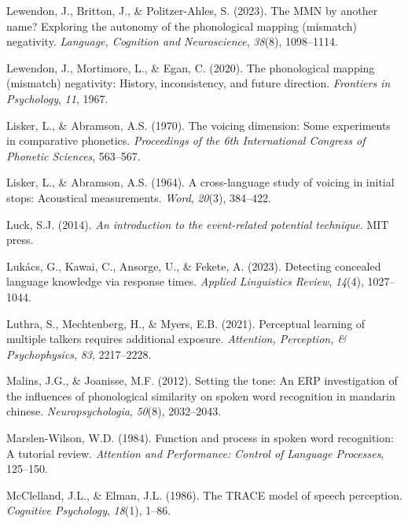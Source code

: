 \documentclass[
  12pt,
  twoside]{article}
\newlength{\cslhangindent}
\newlength{\cslentryspacingunit} %
\newenvironment{CSLReferences}[2] %
 {%
  \setlength{\parindent}{0pt}
  \ifodd #1
  \let\oldpar\par
  \def\par{\hangindent=\cslhangindent\oldpar}
  \fi
  \setlength{\parskip}{#2\cslentryspacingunit}
 }%
 {}
\begin{document}
\begin{CSLReferences}{1}{0}
\leavevmode{}%
Lewendon, J., Britton, J., \& Politzer-Ahles, S. (2023). The MMN by another name? Exploring the autonomy of the phonological mapping (mismatch) negativity. \emph{Language, Cognition and Neuroscience}, \emph{38}(8), 1098--1114.

\leavevmode{}%
Lewendon, J., Mortimore, L., \& Egan, C. (2020). The phonological mapping (mismatch) negativity: History, inconsistency, and future direction. \emph{Frontiers in Psychology}, \emph{11}, 1967.

\leavevmode{}%
Lisker, L., \& Abramson, A.S. (1970). The voicing dimension: Some experiments in comparative phonetics. \emph{Proceedings of the 6th International Congress of Phonetic Sciences}, 563--567.

\leavevmode{}%
Lisker, L., \& Abramson, A.S. (1964). A cross-language study of voicing in initial stops: Acoustical measurements. \emph{Word}, \emph{20}(3), 384--422.

\leavevmode{}%
Luck, S.J. (2014). \emph{An introduction to the event-related potential technique}. MIT press.

\leavevmode{}%
Lukács, G., Kawai, C., Ansorge, U., \& Fekete, A. (2023). Detecting concealed language knowledge via response times. \emph{Applied Linguistics Review}, \emph{14}(4), 1027--1044.

\leavevmode{}%
Luthra, S., Mechtenberg, H., \& Myers, E.B. (2021). Perceptual learning of multiple talkers requires additional exposure. \emph{Attention, Perception, \& Psychophysics}, \emph{83}, 2217--2228.

\leavevmode{}%
Malins, J.G., \& Joanisse, M.F. (2012). Setting the tone: An {ERP} investigation of the influences of phonological similarity on spoken word recognition in mandarin chinese. \emph{Neuropsychologia}, \emph{50}(8), 2032--2043.

\leavevmode{}%
Marslen-Wilson, W.D. (1984). Function and process in spoken word recognition: A tutorial review. \emph{Attention and Performance: Control of Language Processes}, 125--150.

\leavevmode{}%
McClelland, J.L., \& Elman, J.L. (1986). The {TRACE} model of speech perception. \emph{Cognitive Psychology}, \emph{18}(1), 1--86.


\end{CSLReferences}
\end{document}
